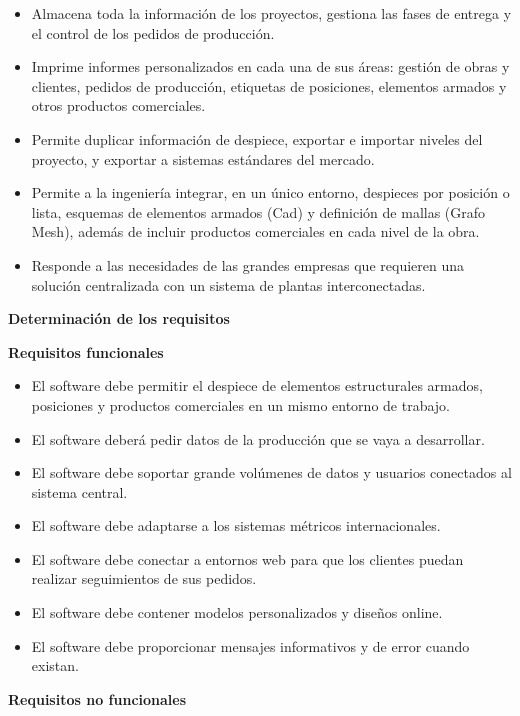 \documentclass[10pt,a4paper]{article}
\begin{document}
\begin{enumerate}
\begin{itemize}
\item Almacena toda la información de los proyectos, gestiona las fases de entrega y el control de los pedidos de producción.
\item Imprime informes personalizados en cada una de sus áreas: gestión de obras y clientes, pedidos de producción, etiquetas de posiciones, elementos armados y otros productos comerciales.
\item Permite duplicar información de despiece, exportar e importar niveles del proyecto, y exportar a sistemas estándares del mercado.
\item Permite a la ingeniería integrar, en un único entorno, despieces por posición o lista, esquemas de elementos armados (Cad) y definición de mallas (Grafo Mesh), además de incluir productos comerciales en cada nivel de la obra.
\item Responde a las necesidades de las grandes empresas que requieren una solución centralizada con un sistema de plantas interconectadas.
\end{itemize}

\textbf{Determinación de los requisitos}

\textbf{Requisitos funcionales}

\begin{itemize}
\item El software debe permitir el despiece de elementos estructurales armados, posiciones y productos comerciales en un mismo entorno de trabajo.
\item El software deberá pedir datos de la producción que se vaya a desarrollar.
\item El software debe soportar grande volúmenes de datos y usuarios conectados al sistema central.
\item El software debe adaptarse a los sistemas métricos internacionales.
\item El software debe conectar a entornos web para que los clientes puedan realizar seguimientos de sus pedidos.
\item El software debe contener modelos personalizados y diseños online.
\item El software debe proporcionar mensajes informativos y de error cuando existan.
\end{itemize}

\textbf{Requisitos no funcionales}


\end{enumerate}
\end{document}
